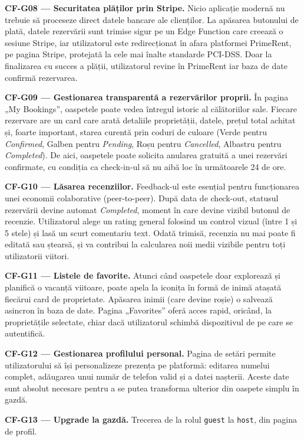 \documentclass[12pt,a4paper,oneside]{report}
\begin{document}
\textbf{CF-G08 — Securitatea plăților prin Stripe.} Nicio aplicație modernă nu trebuie să proceseze direct datele bancare ale clienților. La apăsarea butonului de plată, datele rezervării sunt trimise sigur pe un Edge Function care creează o sesiune Stripe, iar utilizatorul este redirecționat în afara platformei PrimeRent, pe pagina Stripe, protejată la cele mai înalte standarde PCI-DSS. Doar la finalizarea cu succes a plății, utilizatorul revine în PrimeRent iar baza de date confirmă rezervarea.

\textbf{CF-G09 — Gestionarea transparentă a rezervărilor proprii.} În pagina „My Bookings'', oaspetele poate vedea întregul istoric al călătoriilor sale. Fiecare rezervare are un card care arată detaliile proprietății, datele, prețul total achitat și, foarte important, starea curentă prin coduri de culoare (Verde pentru \textit{Confirmed}, Galben pentru \textit{Pending}, Roșu pentru \textit{Cancelled}, Albastru pentru \textit{Completed}). De aici, oaspetele poate solicita anularea gratuită a unei rezervări confirmate, cu condiția ca check-in-ul să nu aibă loc în următoarele 24 de ore.

\textbf{CF-G10 — Lăsarea recenziilor.} Feedback-ul este esențial pentru funcționarea unei economii colaborative (peer-to-peer). După data de check-out, statusul rezervării devine automat \textit{Completed}, moment în care devine vizibil butonul de recenzie. Utilizatorul alege un rating general folosind un control vizual (între 1 și 5 stele) și lasă un scurt comentariu text. Odată trimisă, recenzia nu mai poate fi editată sau ștearsă, și va contribui la calcularea noii medii vizibile pentru toți utilizatorii viitori.

\textbf{CF-G11 — Listele de favorite.} Atunci când oaspetele doar explorează și planifică o vacanță viitoare, poate apela la iconița în formă de inimă atașată fiecărui card de proprietate. Apăsarea inimii (care devine roșie) o salvează asincron în baza de date. Pagina „Favorites'' oferă acces rapid, oricând, la proprietățile selectate, chiar dacă utilizatorul schimbă dispozitivul de pe care se autentifică.

\textbf{CF-G12 — Gestionarea profilului personal.} Pagina de setări permite utilizatorului să își personalizeze prezența pe platformă: editarea numelui complet, adăugarea unui număr de telefon valid și a datei nașterii. Aceste date sunt absolut necesare pentru a se putea transforma ulterior din oaspete simplu în gazdă.

\textbf{CF-G13 — Upgrade la gazdă.} Trecerea de la rolul \texttt{guest} la \texttt{host}, din pagina de profil.
\end{document}
